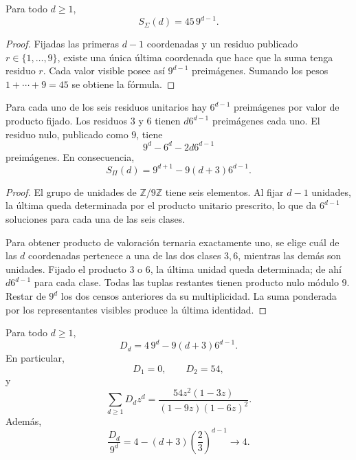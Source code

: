 \begin{lemma}
\label{p12-83-c1-s5:lem:masa-hoja-aditiva-longitud}
Para todo \(d\geq1\),
\[
 S_\Sigma(d)=45\,9^{d-1}.
\]
\end{lemma}

\begin{proof}
Fijadas las primeras \(d-1\) coordenadas y un residuo publicado
\(r\in\{1,\ldots,9\}\), existe una única última coordenada que hace que la
suma tenga residuo \(r\). Cada valor visible posee así \(9^{d-1}\)
preimágenes. Sumando los pesos \(1+\cdots+9=45\) se obtiene la fórmula.
\end{proof}

\begin{lemma}
\label{p12-83-c1-s5:lem:censo-hoja-multiplicativa-longitud}
Para cada uno de los seis residuos unitarios hay \(6^{d-1}\) preimágenes
por valor de producto fijado. Los residuos \(3\) y \(6\) tienen
\(d6^{d-1}\) preimágenes cada uno. El residuo nulo, publicado como \(9\),
tiene
\[
 9^d-6^d-2d6^{d-1}
\]
preimágenes. En consecuencia,
\[
 S_\Pi(d)=9^{d+1}-9(d+3)6^{d-1}.
\]
\end{lemma}

\begin{proof}
El grupo de unidades de \(\mathbb Z/9\mathbb Z\) tiene seis elementos. Al
fijar \(d-1\) unidades, la última queda determinada por el producto
unitario prescrito, lo que da \(6^{d-1}\) soluciones para cada una de las
seis clases.

Para obtener producto de valoración ternaria exactamente uno, se elige cuál
de las \(d\) coordenadas pertenece a una de las dos clases \(3,6\), mientras
las demás son unidades. Fijado el producto \(3\) o \(6\), la última unidad
queda determinada; de ahí \(d6^{d-1}\) para cada clase. Todas las tuplas
restantes tienen producto nulo módulo \(9\). Restar de \(9^d\) los dos
censos anteriores da su multiplicidad. La suma ponderada por los
representantes visibles produce la última identidad.
\end{proof}

\begin{theorem}
\label{p12-83-c1-s5:thm:ley-dimensional-app-autonoma}
Para todo \(d\geq1\),
\[
 \boxed{D_d=4\,9^d-9(d+3)6^{d-1}.}
\]
En particular,
\[
 D_1=0,
 \qquad
 D_2=54,
\]
y
\[
 \sum_{d\geq1}D_dz^d
 =\frac{54z^2(1-3z)}{(1-9z)(1-6z)^2}.
\]
Además,
\[
 \frac{D_d}{9^d}
 =4-(d+3)\left(\frac23\right)^{d-1}
 \longrightarrow4.
\]
\end{theorem}

